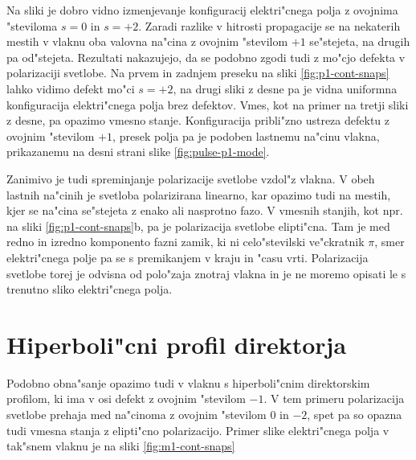 \documentclass[12pt,twoside,openright,final,a4paper]{report}
\begin{document}

Na sliki je dobro vidno izmenjevanje konfiguracij elektri"cnega polja z ovojnima "steviloma $s=0$ in $s=+2$. 
Zaradi razlike v hitrosti propagacije se na nekaterih mestih v vlaknu oba valovna na"cina z ovojnim "stevilom $+1$ se"stejeta, na drugih pa od"stejeta. 
Rezultati nakazujejo, da se podobno zgodi tudi z mo"cjo defekta v polarizaciji svetlobe. 
Na prvem in zadnjem preseku na sliki \ref{fig:p1-cont-snaps} lahko vidimo defekt mo"ci $s=+2$, na drugi sliki z desne pa je vidna uniformna konfiguracija elektri"cnega polja brez defektov. 
Vmes, kot na primer na tretji sliki z desne, pa opazimo vmesno stanje. 
Konfiguracija pribli"zno ustreza defektu z ovojnim "stevilom $+1$, presek polja pa je podoben lastnemu na"cinu vlakna, prikazanemu na desni strani slike \ref{fig:pulse-p1-mode}. 

Zanimivo je tudi spreminjanje polarizacije svetlobe vzdol"z vlakna. 
V obeh lastnih na"cinih je svetloba polarizirana linearno, kar opazimo tudi na mestih, kjer se na"cina se"stejeta z enako ali nasprotno fazo. 
V vmesnih stanjih, kot npr. na sliki \ref{fig:p1-cont-snaps}b, pa je polarizacija svetlobe elipti"cna. 
Tam je med redno in izredno komponento fazni zamik, ki ni celo"stevilski ve"ckratnik $\pi$, smer elektri"cnega polje pa se s premikanjem v kraju in "casu vrti. 
Polarizacija svetlobe torej je odvisna od polo"zaja znotraj vlakna in je ne moremo opisati le s trenutno sliko elektri"cnega polja. 

\cleardoublepage
\section{Hiperboli"cni profil direktorja}

Podobno obna"sanje opazimo tudi v vlaknu s hiperboli"cnim direktorskim profilom, ki ima v osi defekt z ovojnim "stevilom $-1$. 
V tem primeru polarizacija svetlobe prehaja med na"cinoma z ovojnim "stevilom $0$ in $-2$, spet pa so opazna tudi vmesna stanja z elipti"cno polarizacijo. 
Primer slike elektri"cnega polja v tak"snem vlaknu je na sliki \ref{fig:m1-cont-snaps}
\end{document}
